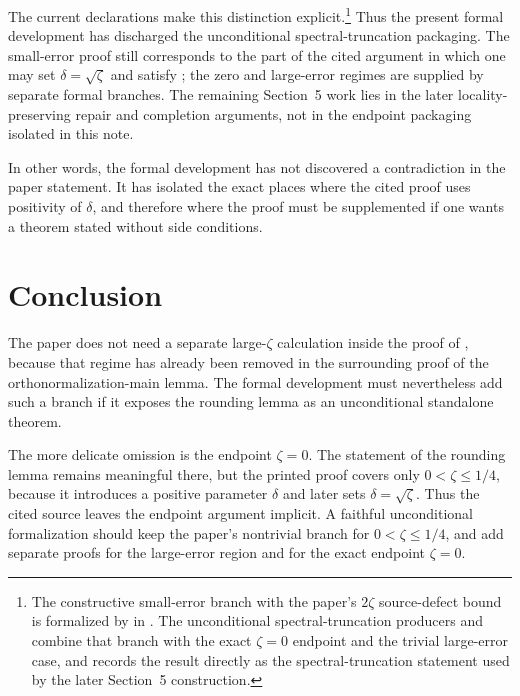 \documentclass[11pt]{article}
\begin{document}
The current \Lean{} declarations make this distinction explicit.\footnote{The
constructive small-error branch with the paper's $2\zeta$ source-defect bound is
formalized by
 in
.
The unconditional spectral-truncation producers
and
 combine that
branch with the exact $\zeta = 0$ endpoint and the trivial large-error case, and
 records the
result directly as the spectral-truncation statement used by the later
Section~5 construction.}
Thus the present formal development has discharged the unconditional
spectral-truncation packaging.  The small-error proof still corresponds to the
part of the cited argument in which one may set $\delta = \sqrt{\zeta}$ and
satisfy ; the zero and large-error regimes are supplied
by separate formal branches.  The remaining Section~5 work lies in the later
locality-preserving repair and completion arguments, not in the endpoint
packaging isolated in this note.

In other words, the formal development has not discovered a contradiction in the
paper statement.  It has isolated the exact places where the cited proof uses
positivity of $\delta$, and therefore where the proof must be supplemented if
one wants a theorem stated without side conditions.

\section{Conclusion}

The paper does not need a separate large-$\zeta$ calculation inside the proof of
, because that regime has already been
removed in the surrounding proof of the orthonormalization-main lemma.  The
formal development must nevertheless add such a branch if it exposes the
rounding lemma as an unconditional standalone theorem.

The more delicate omission is the endpoint $\zeta = 0$.  The statement of the
rounding lemma remains meaningful there, but the printed proof covers only
$0 < \zeta \le 1/4$, because it introduces a positive parameter $\delta$ and
later sets $\delta = \sqrt{\zeta}$.  Thus the cited source leaves the endpoint
argument implicit.  A faithful unconditional formalization should keep the
paper's nontrivial branch for $0 < \zeta \le 1/4$, and add separate proofs for
the large-error region and for the exact endpoint $\zeta = 0$.



\end{document}
